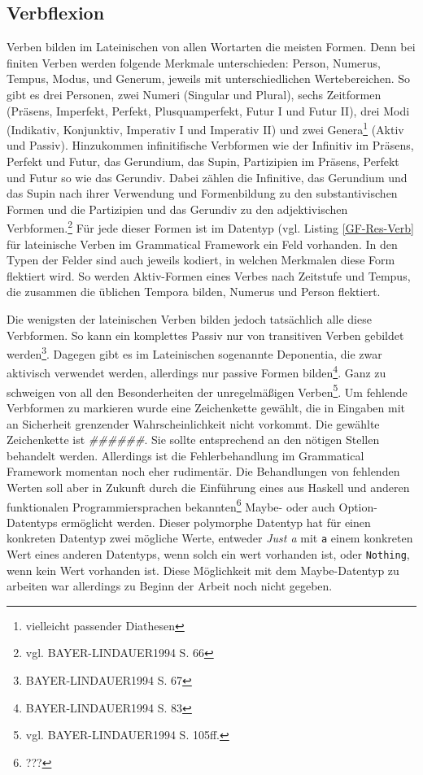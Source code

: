 \documentclass[12pt,abstract=on,titlepage,bibliography=totoc,ngerman,listof=totoc]{scrreprt}
\begin{document}
\subsection{Verbflexion}
\label{subsec:verb}
Verben bilden im Lateinischen von allen Wortarten die meisten Formen. Denn bei finiten Verben werden folgende Merkmale unterschieden: Person, Numerus, Tempus, Modus, und Generum, jeweils mit unterschiedlichen Wertebereichen. So gibt es drei Personen, zwei Numeri (Singular und Plural), sechs Zeitformen (Präsens, Imperfekt, Perfekt, Plusquamperfekt, Futur I und Futur II), drei Modi (Indikativ, Konjunktiv, Imperativ I und Imperativ II) und zwei Genera\footnote{vielleicht passender Diathesen} (Aktiv und Passiv). Hinzukommen infinitifische Verbformen wie der Infinitiv im Präsens, Perfekt und Futur, das Gerundium, das Supin, Partizipien im Präsens, Perfekt und Futur so wie das Gerundiv. Dabei zählen die Infinitive, das Gerundium und das Supin nach ihrer Verwendung und Formenbildung zu den substantivischen Formen und die Partizipien und das Gerundiv zu den adjektivischen Verbformen.\footnote{vgl. BAYER-LINDAUER1994 S. 66} Für jede dieser Formen ist im Datentyp (vgl. Listing \ref{GF-Res-Verb} für lateinische Verben im Grammatical Framework ein Feld vorhanden. In den Typen der Felder sind auch jeweils kodiert, in welchen Merkmalen diese Form flektiert wird. So werden Aktiv-Formen eines Verbes nach Zeitstufe und Tempus, die zusammen die üblichen Tempora bilden, Numerus und Person flektiert.  \par
Die wenigsten der lateinischen Verben bilden jedoch tatsächlich alle diese Verbformen. So kann ein komplettes Passiv nur von transitiven Verben gebildet werden\footnote{BAYER-LINDAUER1994 S. 67}. Dagegen gibt es im Lateinischen sogenannte Deponentia, die zwar aktivisch verwendet werden, allerdings nur passive Formen bilden\footnote{BAYER-LINDAUER1994 S. 83}. Ganz zu schweigen von all den Besonderheiten der unregelmäßigen Verben\footnote{vgl. BAYER-LINDAUER1994 S. 105ff.}. Um fehlende Verbformen zu markieren wurde eine Zeichenkette gewählt, die in Eingaben mit an Sicherheit grenzender Wahrscheinlichkeit nicht vorkommt. Die gewählte Zeichenkette ist \textit{\#\#\#\#\#\#}. Sie sollte entsprechend an den nötigen Stellen behandelt werden. Allerdings ist die Fehlerbehandlung im Grammatical Framework momentan noch eher rudimentär. Die Behandlungen von fehlenden Werten soll aber in Zukunft durch die Einführung eines aus Haskell und anderen funktionalen Programmiersprachen bekannten\footnote{???} Maybe- oder auch Option-Datentyps ermöglicht werden. Dieser polymorphe Datentyp hat für einen konkreten Datentyp zwei mögliche Werte, entweder \textit{Just a} mit \texttt{a} einem konkreten Wert eines anderen Datentyps, wenn solch ein wert vorhanden ist, oder \texttt{Nothing}, wenn kein Wert vorhanden ist. Diese Möglichkeit mit dem Maybe-Datentyp zu arbeiten war allerdings zu Beginn der Arbeit noch nicht gegeben.\par
\end{document}
